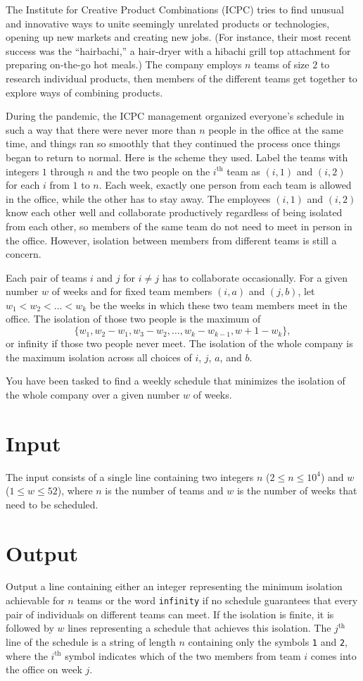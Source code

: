 
The Institute for Creative Product Combinations (ICPC) tries to find unusual and
innovative ways to unite seemingly unrelated products or technologies, opening
up new markets and creating new jobs. (For instance, their most recent success
was the ``hairbachi,'' a hair-dryer with a hibachi grill top attachment for
preparing on-the-go hot meals.) The company employs $n$ teams of size $2$ to
research individual products, then members of the different teams get together
to explore ways of combining products.

During the pandemic, the ICPC management organized everyone's schedule in such
a way that there were never more than $n$ people in the office at the same
time, and things ran so smoothly that they continued the process once things
began to return to normal. Here is the scheme they used. Label the teams with
integers $1$ through $n$ and the two people on the $i^{\text{th}}$ team as $(i,1)$ and
$(i,2)$ for each $i$ from $1$ to $n$.  Each week, exactly one person from each
team is allowed in the office, while the other has to stay away.  The employees
$(i,1)$ and $(i,2)$ know each other well and collaborate productively
regardless of being isolated from each other, so members of the same team do not
need to meet in person in the office. However, isolation between members from
different teams is still a concern.

Each pair of teams $i$ and $j$ for $i \neq j$ has to collaborate occasionally.
For a given number $w$
of weeks and for fixed team members $(i,a)$ and $(j,b)$, let $w_1
< w_2 < \ldots < w_k$ be the weeks in which these two team members meet in the
office. The isolation of those two people is the maximum of
$$
\{w_1, w_2-w_1, w_3-w_2, \ldots, w_k - w_{k-1}, w+1-w_k\},
$$
or infinity if those two people never meet.  The isolation of
the whole company is the maximum isolation across all choices of $i$, $j$, $a$,
and $b$.

You have been tasked to find a weekly schedule that
minimizes the isolation of the whole company over a given number $w$ of weeks.

\section*{Input}
The input consists of a single line containing two integers $n$ ($2 \leq n \leq 10^4$) and $w$
($1 \leq w \leq 52$), where $n$ is the number of teams and $w$ is the number
of weeks that need to be scheduled.

\section*{Output}
Output a line containing either an integer representing the minimum isolation
achievable for $n$ teams or the word \texttt{infinity} if no schedule
guarantees that every pair of individuals on different teams can meet. If the isolation is finite,
it is followed by $w$ lines representing a schedule that achieves this
isolation. The $j^{\text{th}}$  line of the schedule is a string of length $n$
containing only the symbols \texttt{1} and \texttt{2}, where the $i^{\text{th}}$  symbol
indicates which of the two members from team $i$ comes into the office on week
$j$.
